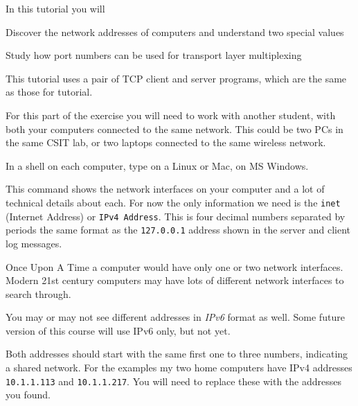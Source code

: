 










In this tutorial you will

\DOT Discover the network addresses of computers and understand two special values

\DOT Study how port numbers can be used for transport layer multiplexing

This tutorial uses a pair of TCP client and server programs, which are the same as
those for  tutorial.


For this part of the exercise you will need to work with another student, with both your
computers connected to the same network. This could be two PCs in the same CSIT lab, or
two laptops connected to the same wireless network.

\STEP In a shell on each computer, type  on a Linux or Mac,
 on MS Windows.

This command shows the network interfaces on your computer and a lot of technical details
about each. For now the only information we need is the \texttt{inet} (Internet Address)
or \texttt{IPv4 Address}. This is four decimal numbers separated by periods \DSH the same
format as the \texttt{127.0.0.1} address shown in the server and client log messages.

\begin{IMPORTANT}
Once Upon A Time a computer would have only one or two network interfaces. Modern 21st
century computers may have lots of different network interfaces to search through.

You may or may not see different addresses in \emph{IPv6} format as well. Some future version
of this course will use IPv6 only, but not yet.
\end{IMPORTANT}

Both addresses should start with the same first one to three numbers, indicating a
shared network.
For the examples my two home computers have IPv4 addresses \texttt{10.1.1.113}
and \texttt{10.1.1.217}. You will need to replace these with the addresses you found.


